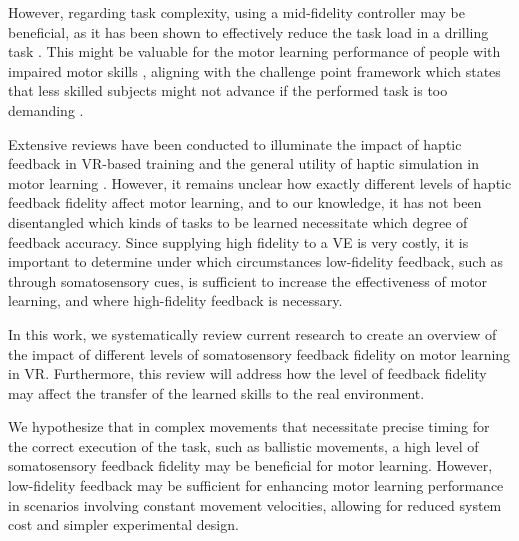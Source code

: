However, regarding task complexity, using a mid-fidelity controller may be beneficial, as it has been shown to effectively reduce the task load in a drilling task \cite{Yang2023}. This might be valuable for the motor learning performance of people with impaired motor skills \cite{Sigrist2013AugmentedReview}, aligning with the challenge point framework which states that less skilled subjects might not advance if the performed task is too demanding \cite{Guadagnoll2004ChallengeLearning}. 

Extensive reviews have been conducted to illuminate the impact of haptic feedback in VR-based training \cite{Sigrist2013AugmentedReview} and the general utility of haptic simulation in motor learning \cite{Al-Saud2021TheReview}. However, it remains unclear how exactly different levels of haptic feedback fidelity affect motor learning, and to our knowledge, it has not been disentangled which kinds of tasks to be learned necessitate which degree of feedback accuracy.
Since supplying high fidelity to a VE is very costly, it is important to determine under which circumstances low-fidelity feedback, such as through somatosensory cues, is sufficient to increase the effectiveness of motor learning, and where high-fidelity feedback is necessary. 

In this work, we systematically review current research to create an overview of the impact of different levels of somatosensory feedback fidelity on motor learning in VR. Furthermore, this review will address how the level of feedback fidelity may affect the transfer of the learned skills to the real environment.

We hypothesize that in complex movements that necessitate precise timing for the correct execution of the task, such as ballistic movements, a high level of somatosensory feedback fidelity may be beneficial for motor learning. However, low-fidelity feedback may be sufficient for enhancing motor learning performance in scenarios involving constant movement velocities, allowing for reduced system cost and simpler experimental design. 

\newpage

